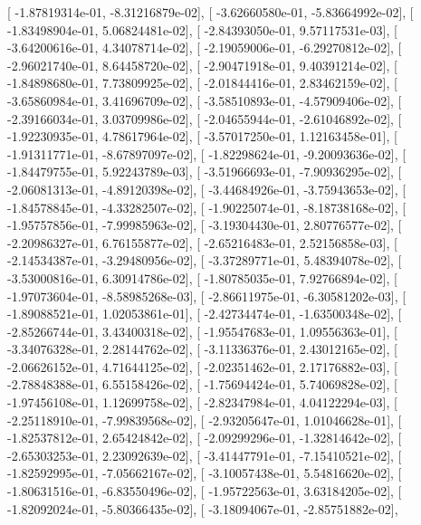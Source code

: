 \documentclass{article}
\begin{document}
       [ -1.87819314e-01,  -8.31216879e-02],
       [ -3.62660580e-01,  -5.83664992e-02],
       [ -1.83498904e-01,   5.06824481e-02],
       [ -2.84393050e-01,   9.57117531e-03],
       [ -3.64200616e-01,   4.34078714e-02],
       [ -2.19059006e-01,  -6.29270812e-02],
       [ -2.96021740e-01,   8.64458720e-02],
       [ -2.90471918e-01,   9.40391214e-02],
       [ -1.84898680e-01,   7.73809925e-02],
       [ -2.01844416e-01,   2.83462159e-02],
       [ -3.65860984e-01,   3.41696709e-02],
       [ -3.58510893e-01,  -4.57909406e-02],
       [ -2.39166034e-01,   3.03709986e-02],
       [ -2.04655944e-01,  -2.61046892e-02],
       [ -1.92230935e-01,   4.78617964e-02],
       [ -3.57017250e-01,   1.12163458e-01],
       [ -1.91311771e-01,  -8.67897097e-02],
       [ -1.82298624e-01,  -9.20093636e-02],
       [ -1.84479755e-01,   5.92243789e-03],
       [ -3.51966693e-01,  -7.90936295e-02],
       [ -2.06081313e-01,  -4.89120398e-02],
       [ -3.44684926e-01,  -3.75943653e-02],
       [ -1.84578845e-01,  -4.33282507e-02],
       [ -1.90225074e-01,  -8.18738168e-02],
       [ -1.95757856e-01,  -7.99985963e-02],
       [ -3.19304430e-01,   2.80776577e-02],
       [ -2.20986327e-01,   6.76155877e-02],
       [ -2.65216483e-01,   2.52156858e-03],
       [ -2.14534387e-01,  -3.29480956e-02],
       [ -3.37289771e-01,   5.48394078e-02],
       [ -3.53000816e-01,   6.30914786e-02],
       [ -1.80785035e-01,   7.92766894e-02],
       [ -1.97073604e-01,  -8.58985268e-03],
       [ -2.86611975e-01,  -6.30581202e-03],
       [ -1.89088521e-01,   1.02053861e-01],
       [ -2.42734474e-01,  -1.63500348e-02],
       [ -2.85266744e-01,   3.43400318e-02],
       [ -1.95547683e-01,   1.09556363e-01],
       [ -3.34076328e-01,   2.28144762e-02],
       [ -3.11336376e-01,   2.43012165e-02],
       [ -2.06626152e-01,   4.71644125e-02],
       [ -2.02351462e-01,   2.17176882e-03],
       [ -2.78848388e-01,   6.55158426e-02],
       [ -1.75694424e-01,   5.74069828e-02],
       [ -1.97456108e-01,   1.12699758e-02],
       [ -2.82347984e-01,   4.04122294e-03],
       [ -2.25118910e-01,  -7.99839568e-02],
       [ -2.93205647e-01,   1.01046628e-01],
       [ -1.82537812e-01,   2.65424842e-02],
       [ -2.09299296e-01,  -1.32814642e-02],
       [ -2.65303253e-01,   2.23092639e-02],
       [ -3.41447791e-01,  -7.15410521e-02],
       [ -1.82592995e-01,  -7.05662167e-02],
       [ -3.10057438e-01,   5.54816620e-02],
       [ -1.80631516e-01,  -6.83550496e-02],
       [ -1.95722563e-01,   3.63184205e-02],
       [ -1.82092024e-01,  -5.80366435e-02],
       [ -3.18094067e-01,  -2.85751882e-02],
\end{document}
